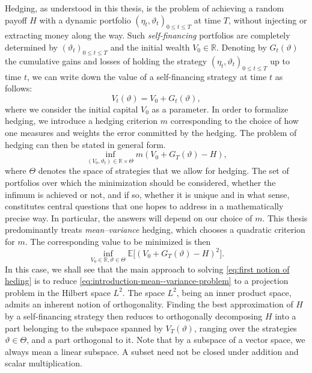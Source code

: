 \documentclass[11pt,a4paper,twoside,openany]{report}
\numberwithin{equation}{section}
\theoremstyle{plain} %
\theoremstyle{definition} %
\theoremstyle{remark} %
\begin{document}
Hedging, as understood in this thesis, is the problem of achieving a random payoff \(H\) with a dynamic portfolio  \((\eta_t,\vartheta_t)_{0\leq t\leq T}\) at time \(T\), without injecting or extracting money along the way. Such \textit{self-financing} portfolios are completely determined by \((\vartheta_t)_{0\leq t\leq T}\) and the initial wealth \(V_0\in\mathbb{R}\). Denoting by \(G_t(\vartheta)\) the cumulative gains and losses of holding the strategy \((\eta_t,\vartheta_t)_{0\leq t\leq T}\)  up to time \(t\), we can write down the value of a self-financing strategy at time \(t\) as follows:
\begin{equation}\label{eq:value process}
    V_t(\vartheta)=V_0+G_t(\vartheta),
\end{equation}
where we consider the initial capital \(V_0\) as a parameter.
In order to formalize hedging, we introduce a hedging criterion \(m\) corresponding to the choice of how one measures and weights the error committed by the hedging.
The problem of hedging can then be stated in general form.
\begin{equation}\label{eq:first notion of heding}
    \inf_{(V_0,\vartheta_t)\in\mathbb{R}\times\Theta}m(V_0+G_{T}(\vartheta)-H),
\end{equation}
where \(\Theta\) denotes the space of strategies that we allow for hedging. The
 set of portfolios over which the minimization should be considered, whether the infimum is achieved or not, and if so, whether it is unique and in what sense, constitutes central questions that one hopes to address in a mathematically precise way. In particular, the answers will depend on our choice of \(m\). This thesis predominantly treats \textit{mean--variance} hedging, which chooses a quadratic criterion for \(m\). The corresponding value to be minimized is then
\begin{equation}\label{eq:introduction-mean--variance-problem}
    \inf_{V_0\in\mathbb{R},\vartheta\in\Theta}\mathbb{E}\Big[
        (V_0 + G_T(\vartheta)-H)^2
    \Big].
\end{equation}
In this case, we shall see that the main approach to solving \eqref{eq:first notion of heding} is to reduce \eqref{eq:introduction-mean--variance-problem} to a projection problem in the Hilbert space \(L^2\). The space \(L^2\), being an inner product space, admits an inherent notion of orthogonality. Finding the best approximation of \(H\) by a self-financing strategy  then reduces to orthogonally decomposing \(H\) into a part belonging to the subspace spanned by \(V_T(\vartheta)\), ranging over the strategies \(\vartheta\in\Theta\), and a part orthogonal to it. Note that by a subspace of a vector space, we always mean a linear subspace. A subset need not be closed under addition and scalar multiplication. 
\end{document}
